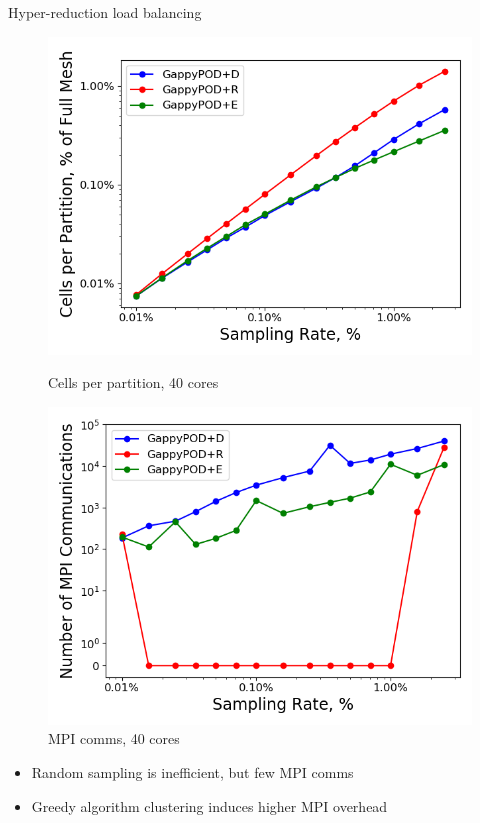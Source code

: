 \documentclass[]{beamer}
\begin{document}
\begin{frame}{Hyper-reduction load balancing}
	\begin{figure}
		\begin{minipage}{0.49\linewidth}
			\includegraphics[width=0.99\linewidth]{experiments/box/partitionSamplingTypeStudy_partition_stats.png}
			\caption*{Cells per partition, 40 cores}
		\end{minipage}
		\begin{minipage}{0.49\linewidth}
			\includegraphics[width=0.99\linewidth]{experiments/box/partitionSamplingTypeStudy_partition_comms.png}
			\caption*{MPI comms, 40 cores}
		\end{minipage}
	\end{figure}
	\begin{itemize}
		\item Random sampling is inefficient, but few MPI comms
		\item Greedy algorithm clustering induces higher MPI overhead
	\end{itemize}
\end{frame}
\end{document}
